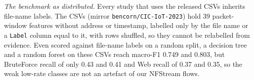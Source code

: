 \emph{The benchmark as distributed.} Every study that uses the released CSVs inherits file-name labels. The CSVs (mirror \texttt{bencorn/CIC-IoT-2023}) hold 39 packet-window features without address or timestamp, labelled only by the file name or a \texttt{Label} column equal to it, with rows shuffled, so they cannot be relabelled from evidence. Even scored against file-name labels on a random split, a decision tree and a random forest on these CSVs reach macro-F1 0.749 and 0.803, but BruteForce recall of only 0.43 and 0.41 and Web recall of 0.37 and 0.35, so the weak low-rate classes are not an artefact of our NFStream flows.

